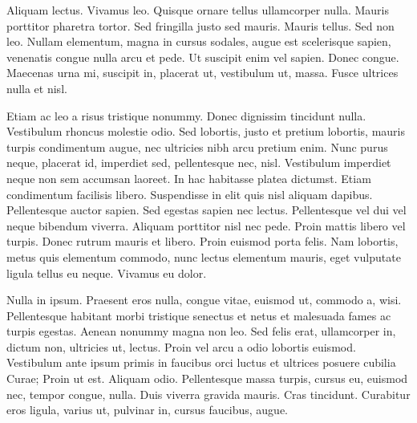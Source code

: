 \documentclass[APA,STIX1COL]{WileyNJD-v2}
\begin{document}
Aliquam lectus. Vivamus leo. Quisque ornare tellus ullamcorper nulla. Mauris porttitor pharetra tortor. Sed fringilla
justo sed mauris. Mauris tellus. Sed non leo. Nullam elementum, magna in cursus sodales, augue est scelerisque
sapien, venenatis congue nulla arcu et pede. Ut suscipit enim vel sapien. Donec congue. Maecenas urna mi, suscipit
in, placerat ut, vestibulum ut, massa. Fusce ultrices nulla et nisl.

Etiam ac leo a risus tristique nonummy. Donec dignissim tincidunt nulla. Vestibulum rhoncus molestie odio. Sed
lobortis, justo et pretium lobortis, mauris turpis condimentum augue, nec ultricies nibh arcu pretium enim. Nunc
purus neque, placerat id, imperdiet sed, pellentesque nec, nisl. Vestibulum imperdiet neque non sem accumsan laoreet.
In hac habitasse platea dictumst. Etiam condimentum facilisis libero. Suspendisse in elit quis nisl aliquam dapibus.
Pellentesque auctor sapien. Sed egestas sapien nec lectus. Pellentesque vel dui vel neque bibendum viverra. Aliquam
porttitor nisl nec pede. Proin mattis libero vel turpis. Donec rutrum mauris et libero. Proin euismod porta felis.
Nam lobortis, metus quis elementum commodo, nunc lectus elementum mauris, eget vulputate ligula tellus eu neque.
Vivamus eu dolor.

Nulla in ipsum. Praesent eros nulla, congue vitae, euismod ut, commodo a, wisi. Pellentesque habitant morbi
tristique senectus et netus et malesuada fames ac turpis egestas. Aenean nonummy magna non leo. Sed felis erat,
ullamcorper in, dictum non, ultricies ut, lectus. Proin vel arcu a odio lobortis euismod. Vestibulum ante ipsum primis
in faucibus orci luctus et ultrices posuere cubilia Curae; Proin ut est. Aliquam odio. Pellentesque massa turpis, cursus
eu, euismod nec, tempor congue, nulla. Duis viverra gravida mauris. Cras tincidunt. Curabitur eros ligula, varius ut,
pulvinar in, cursus faucibus, augue.
\end{document}
